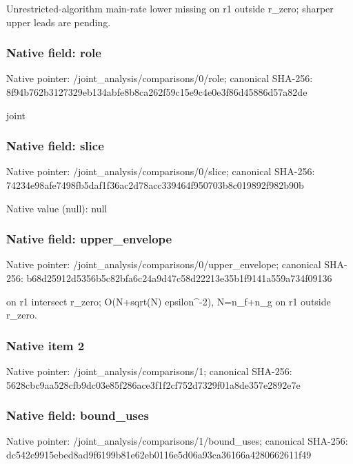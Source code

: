 \documentclass[10pt,a4paper]{article}
\begin{document}
\begingroup\raggedright\sloppy Unrestricted-algorithm main-rate lower missing on r1 outside r\_\allowbreak{}zero;\allowbreak{} sharper upper leads are pending.\par\endgroup

\subsubsection{Native field: role}
Native pointer: /joint\_\allowbreak{}analysis/comparisons/0/role; canonical SHA-256: 8f94b762b3127329eb134abfe8b8ca262f59c15e9c4e0e3f86d45886d57a82de

\begingroup\raggedright\sloppy joint\par\endgroup

\subsubsection{Native field: slice}
Native pointer: /joint\_\allowbreak{}analysis/comparisons/0/slice; canonical SHA-256: 74234e98afe7498fb5daf1f36ac2d78acc339464f950703b8c019892f982b90b

Native value (null): null

\subsubsection{Native field: upper\_\allowbreak{}envelope}
Native pointer: /joint\_\allowbreak{}analysis/comparisons/0/upper\_\allowbreak{}envelope; canonical SHA-256: b68d25912d5356b5c82bfa6c24a9d47c58d22213e35b1f9141a559a734f09136

\begingroup\raggedright{} on r1 intersect r\_\allowbreak{}zero;\allowbreak{} O(N+sqrt(N) epsilon\textasciicircum{}-2),\allowbreak{} N=\allowbreak{}n\_\allowbreak{}f+n\_\allowbreak{}g on r1 outside r\_\allowbreak{}zero.\par\endgroup

\subsubsection{Native item 2}
Native pointer: /joint\_\allowbreak{}analysis/comparisons/1; canonical SHA-256: 5628cbc9aa528cfb9dc03e85f286ace3f1f2cf752d7329f01a8de357e2892e7e

\subsubsection{Native field: bound\_\allowbreak{}uses}
Native pointer: /joint\_\allowbreak{}analysis/comparisons/1/bound\_\allowbreak{}uses; canonical SHA-256: dc542e9915ebed8ad9f6199b81e62eb0116e5d06a93ca36166a4280662611f49
\end{document}
